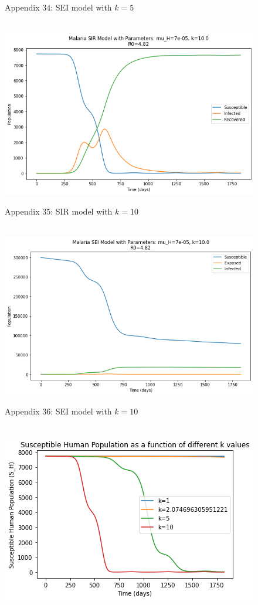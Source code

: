 \documentclass[
	12pt,				%
	oneside,			%
	a4paper,			%
	english,			%
	brazil				%
	]{abntex2}
\begin{document}
\begin{apendicesenv}
\begin{figure}[!ht]
	\caption*{Appendix 34: SEI model with $k=5$}
\end{figure}
\newpage
\begin{figure}[!ht]
	\centering
	\hbox{\hspace{3.0em} \includegraphics[scale=0.6] {THESIS-SIR_k_10.png}}
	\caption*{Appendix 35: SIR model with $k=10$}
\end{figure} 
\begin{figure}[!ht]
	\centering
	\hbox{\hspace{3.0em} \includegraphics[scale=0.6] {THESIS-SEI_k_10.png}}
	\caption*{Appendix 36: SEI model with $k=10$}
\end{figure}
\newpage
\begin{figure}[!ht]
	\centering
	\hbox{\hspace{7.0em} \includegraphics[scale=0.65] {THESIS-SH_for_k_values_Correction.png}}

\end{figure}
\end{apendicesenv}
\end{document}
